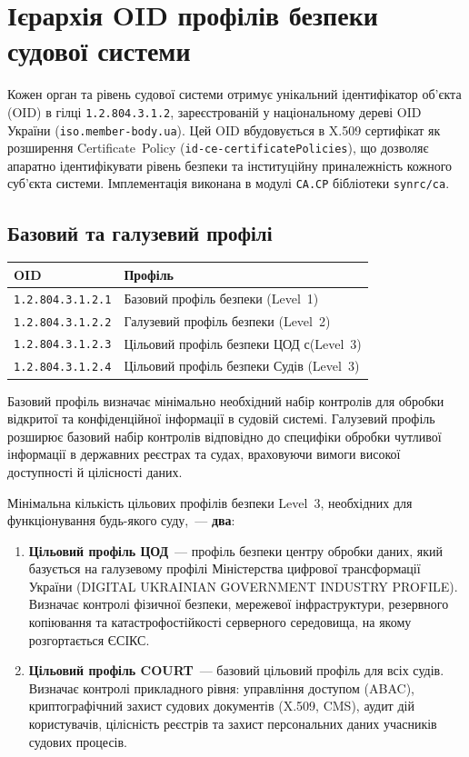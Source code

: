 \section{Ієрархія OID профілів безпеки судової системи}

Кожен орган та рівень судової системи отримує унікальний ідентифікатор об'єкта
(OID) в гілці \texttt{1.2.804.3.1.2}, зареєстрованій у національному дереві OID
України (\texttt{iso.member-body.ua}). Цей OID вбудовується в X.509 сертифікат як
розширення Certificate~Policy (\texttt{id-ce-certificatePolicies}), що дозволяє
апаратно ідентифікувати рівень безпеки та інституційну приналежність кожного
суб'єкта системи. Імплементація виконана в модулі \texttt{CA.CP} бібліотеки
\texttt{synrc/ca}.

\subsection{Базовий та галузевий профілі}

\begin{tabular}{ll}
\textbf{OID}                 & \textbf{Профіль} \\
\hline
\texttt{1.2.804.3.1.2.1}     & Базовий профіль безпеки (Level~1) \\
\texttt{1.2.804.3.1.2.2}     & Галузевий профіль безпеки (Level~2) \\
\texttt{1.2.804.3.1.2.3}     & Цільовий профіль безпеки ЦОД с(Level~3) \\
\texttt{1.2.804.3.1.2.4}     & Цільовий профіль безпеки Судів (Level~3) \\
\end{tabular}

\vspace{0.5em}
Базовий профіль визначає мінімально необхідний набір контролів для обробки відкритої
та конфіденційної інформації в судовій системі. Галузевий профіль розширює базовий
набір контролів відповідно до специфіки обробки чутливої інформації в державних
реєстрах та судах, враховуючи вимоги високої доступності й цілісності даних.

Мінімальна кількість цільових профілів безпеки Level~3, необхідних для функціонування
будь-якого суду,~--- \textbf{два}:

\begin{enumerate}
    \item \textbf{Цільовий профіль ЦОД}~--- профіль безпеки центру обробки даних,
          який базується на галузевому профілі Міністерства цифрової трансформації
          України (DIGITAL UKRAINIAN GOVERNMENT INDUSTRY PROFILE). Визначає контролі
          фізичної безпеки, мережевої інфраструктури, резервного копіювання та
          катастрофостійкості серверного середовища, на якому розгортається ЄСІКС.
    \item \textbf{Цільовий профіль COURT}~--- базовий цільовий профіль для всіх
          судів. Визначає контролі прикладного рівня: управління доступом (ABAC),
          криптографічний захист судових документів (X.509, CMS), аудит дій
          користувачів, цілісність реєстрів та захист персональних даних учасників
          судових процесів.
\end{enumerate}

